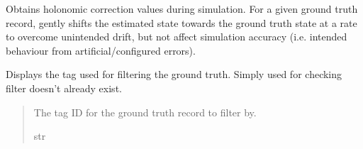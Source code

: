 \documentclass[letterpaper,10pt,english]{sphinxmanual}
\begin{document}
\begin{fulllineitems}
\label{\detokenize{modules/simulation/holonomic:qnav.simulation.holonomic.HolonomicConstraint}}
\pysigstartsignatures
{}
\pysigstopsignatures
\sphinxAtStartPar
Obtains holonomic correction values during simulation.
For a given ground truth record, gently shifts the estimated state towards
the ground truth state at a rate to overcome unintended drift, but not
affect simulation accuracy (i.e. intended behaviour from
artificial/configured errors).

\begin{fulllineitems}
\label{\detokenize{modules/simulation/holonomic:qnav.simulation.holonomic.HolonomicConstraint.filter_id}}
\pysigstartsignatures
{}
\pysigstopsignatures
\sphinxAtStartPar
Displays the tag used for filtering the ground truth.
Simply used for checking filter doesn’t already exist.
\begin{quote}\begin{description}
\sphinxAtStartPar
The tag ID for the ground truth record to filter by.

\sphinxAtStartPar
str

\end{description}\end{quote}

\end{fulllineitems}



\end{fulllineitems}
\end{document}
